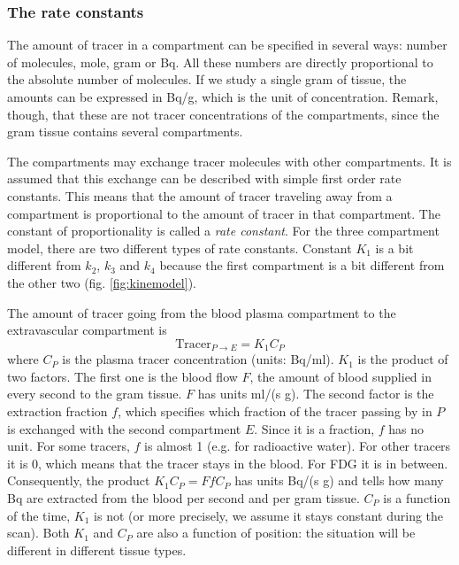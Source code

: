 \subsubsection{The rate constants}
The amount of tracer in a compartment can be specified in several ways: number
of molecules, mole, gram or Bq. All these numbers are directly proportional to
the absolute number of molecules. If we study a single gram of tissue, the
amounts can be expressed in Bq/g, which is the unit of concentration. Remark,
though, that these are not tracer concentrations of the compartments, since the
gram tissue contains several compartments.

The compartments may exchange tracer molecules with other compartments. It is
assumed that this exchange can be described with simple first order rate
constants. This means that the amount of tracer traveling away from a
compartment is proportional to the amount of tracer in that compartment. The
constant of proportionality is called a {\em rate constant}. For the three
compartment model, there are two different types of rate constants. Constant
$K_1$ is a bit different from $k_2$, $k_3$ and $k_4$ because the first
compartment is a bit different from the other two  (fig. \ref{fig:kinemodel}).

The amount of tracer going from the blood plasma compartment to the
extravascular compartment is
\begin{equation}
  \mbox{Tracer}_{P \rightarrow E} = K_1 C_P
\end{equation}
where $C_P$ is the plasma tracer concentration (units: Bq/ml). $K_1$ is the
product of two factors. The first one is the blood flow $F$, the amount of
blood supplied in every second to the gram tissue. $F$ has units ml/(s g).
The second factor is the extraction fraction $f$, which specifies which
fraction of the tracer passing by in $P$ is exchanged with the second
compartment $E$. Since it is a fraction, $f$ has no unit. For some tracers,
$f$ is almost 1 (e.g. for radioactive water). For other tracers it is 0, which
means that the tracer stays in the blood. For FDG it is in
between. Consequently, the product $K_1 C_P = F f C_P$ has units Bq/(s g) and
tells how many Bq are extracted from the blood per second and per gram tissue.
$C_P$ is a function of the time, $K_1$ is not (or more precisely, we assume
it stays constant during the scan). Both $K_1$ and $C_P$ are also a
function of position: the situation will be different in different tissue types.

